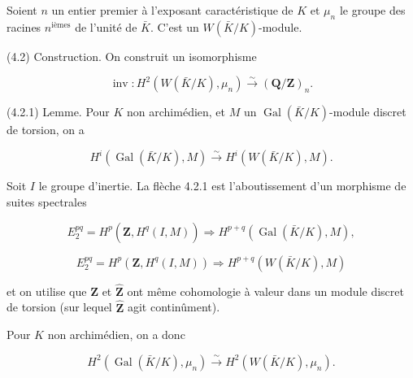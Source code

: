 \documentclass[9pt,twoside]{extarticle}
\begin{document}
{Soient \(n\) un entier premier à l’exposant caractéristique de \(K\) et \(\mu_n\) le groupe des racines \(n^{\mathrm{ièmes}}\) de l’unité de \(\bar K\). C’est un \(W(\bar K/K)\)-module.\par

(4.2) Construction. On construit un isomorphisme\par

\[
\operatorname{inv}:H^2(W(\bar K/K),\mu_n)\xrightarrow{\sim}(\mathbf Q/\mathbf Z)_n.
\]

(4.2.1) Lemme. Pour \(K\) non archimédien, et \(M\) un \(\operatorname{Gal}(\bar K/K)\)-module discret de torsion, on a\par

\[
H^i(\operatorname{Gal}(\bar K/K),M)\xrightarrow{\sim}H^i(W(\bar K/K),M).
\]

Soit \(I\) le groupe d’inertie. La flèche 4.2.1 est l’aboutissement d’un morphisme de suites spectrales\par

\[
E_2^{pq}=H^p(\widehat{\mathbf Z},H^q(I,M))\Rightarrow H^{p+q}(\operatorname{Gal}(\bar K/K),M),
\]

\[
E_2^{pq}=H^p(\mathbf Z,H^q(I,M))\Rightarrow H^{p+q}(W(\bar K/K),M)
\]

et on utilise que \(\mathbf Z\) et \(\widehat{\mathbf Z}\) ont même cohomologie à valeur dans un module discret de torsion (sur lequel \(\widehat{\mathbf Z}\) agit continûment).\par

Pour \(K\) non archimédien, on a donc\par

\[
H^2(\operatorname{Gal}(\bar K/K),\mu_n)\xrightarrow{\sim}H^2(W(\bar K/K),\mu_n).
\]
}
\end{document}
